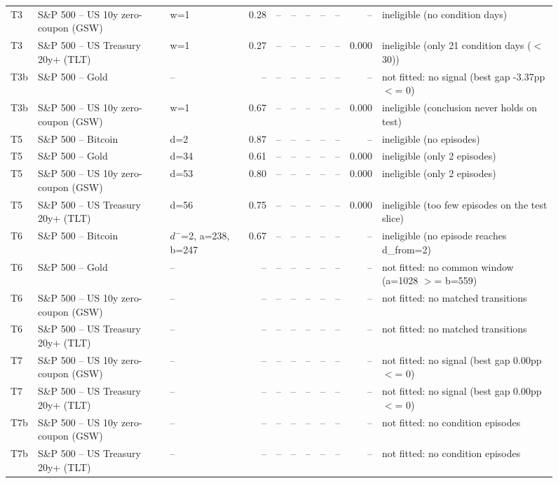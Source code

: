 \begin{figure}
\begin{tabular}{lllrrrrrrrl}
T3 & S\&P 500 -- US 10y zero-coupon (GSW) & w=1 & 0.28 & -- & -- & -- & -- & -- & -- & ineligible (no condition days) \\
T3 & S\&P 500 -- US Treasury 20y+ (TLT) & w=1 & 0.27 & -- & -- & -- & -- & -- & 0.000 & ineligible (only 21 condition days ($<$ 30)) \\
T3b & S\&P 500 -- Gold & -- & -- & -- & -- & -- & -- & -- & -- & not fitted: no signal (best gap -3.37pp $<$= 0) \\
T3b & S\&P 500 -- US 10y zero-coupon (GSW) & w=1 & 0.67 & -- & -- & -- & -- & -- & 0.000 & ineligible (conclusion never holds on test) \\
T5 & S\&P 500 -- Bitcoin & d=2 & 0.87 & -- & -- & -- & -- & -- & -- & ineligible (no episodes) \\
T5 & S\&P 500 -- Gold & d=34 & 0.61 & -- & -- & -- & -- & -- & 0.000 & ineligible (only 2 episodes) \\
T5 & S\&P 500 -- US 10y zero-coupon (GSW) & d=53 & 0.80 & -- & -- & -- & -- & -- & 0.000 & ineligible (only 2 episodes) \\
T5 & S\&P 500 -- US Treasury 20y+ (TLT) & d=56 & 0.75 & -- & -- & -- & -- & -- & 0.000 & ineligible (too few episodes on the test slice) \\
T6 & S\&P 500 -- Bitcoin & $d^-$=2, a=238, b=247 & 0.67 & -- & -- & -- & -- & -- & -- & ineligible (no episode reaches d\_from=2) \\
T6 & S\&P 500 -- Gold & -- & -- & -- & -- & -- & -- & -- & -- & not fitted: no common window (a=1028 $>$= b=559) \\
T6 & S\&P 500 -- US 10y zero-coupon (GSW) & -- & -- & -- & -- & -- & -- & -- & -- & not fitted: no matched transitions \\
T6 & S\&P 500 -- US Treasury 20y+ (TLT) & -- & -- & -- & -- & -- & -- & -- & -- & not fitted: no matched transitions \\
T7 & S\&P 500 -- US 10y zero-coupon (GSW) & -- & -- & -- & -- & -- & -- & -- & -- & not fitted: no signal (best gap 0.00pp $<$= 0) \\
T7 & S\&P 500 -- US Treasury 20y+ (TLT) & -- & -- & -- & -- & -- & -- & -- & -- & not fitted: no signal (best gap 0.00pp $<$= 0) \\
T7b & S\&P 500 -- US 10y zero-coupon (GSW) & -- & -- & -- & -- & -- & -- & -- & -- & not fitted: no condition episodes \\
T7b & S\&P 500 -- US Treasury 20y+ (TLT) & -- & -- & -- & -- & -- & -- & -- & -- & not fitted: no condition episodes \\

\end{tabular}
\end{figure}
